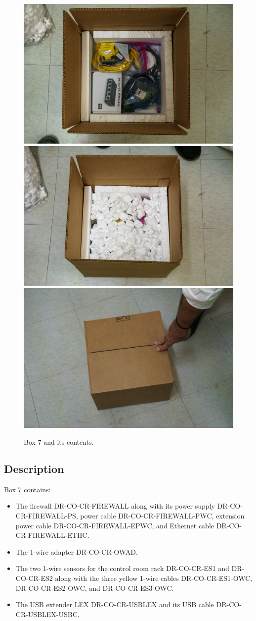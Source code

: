 \documentclass{article}
\begin{document}
\begin{figure}[bp]
\begin{center}
\includegraphics[width=0.60\linewidth]{figures/20201207T172137.jpg}\\[\smallskipamount]
\includegraphics[width=0.60\linewidth]{figures/20201207T172242.jpg}\\[\smallskipamount]
\includegraphics[width=0.60\linewidth]{figures/20201207T172749.jpg}\\[\smallskipamount]
\end{center}
\caption{Box 7 and its contents.}
\label{figure:box-seven-b}
\end{figure}

\subsection{Description}

Box 7 contains:
\begin{itemize}
\item The firewall DR-CO-CR-FIREWALL along with its power supply
DR-CO-CR-FIREWALL-PS, power cable DR-CO-CR-FIREWALL-PWC, extension power cable
DR-CO-CR-FIREWALL-EPWC, and Ethernet cable
DR-CO-CR-FIREWALL-ETHC.
\item The 1-wire adapter DR-CO-CR-OWAD.
\item The two 1-wire sensors for the control room rack 
DR-CO-CR-ES1 and
DR-CO-CR-ES2
along with the three yellow 1-wire cables 
DR-CO-CR-ES1-OWC,
DR-CO-CR-ES2-OWC, and
DR-CO-CR-ES3-OWC.
\item The USB extender LEX 
DR-CO-CR-USBLEX and its USB cable
DR-CO-CR-USBLEX-USBC.
\end{itemize}
\end{document}
